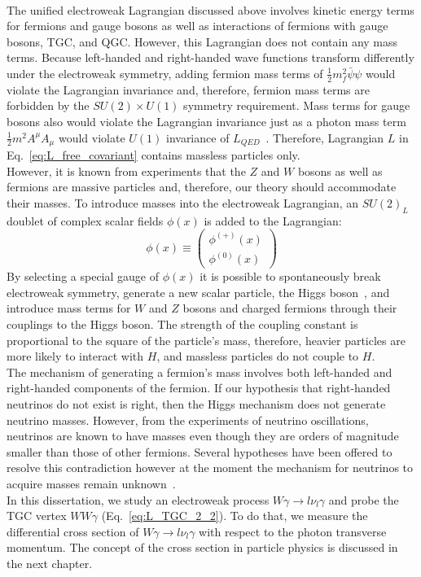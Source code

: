 \\
The unified electroweak Lagrangian discussed above involves kinetic energy terms for fermions and gauge bosons as well as interactions of fermions with gauge bosons, TGC, and QGC. However, this Lagrangian does not contain any mass terms. Because left-handed and right-handed wave functions transform differently under the electroweak symmetry, adding fermion mass terms of $\frac{1}{2} m_f^2 \bar{\psi} \psi$ would violate the Lagrangian invariance and, therefore, fermion mass terms are forbidden by the $SU(2) \times U(1)$ symmetry requirement. Mass terms for gauge bosons also would violate the Lagrangian invariance just as a photon mass term $\frac{1}{2} m^2 A^\mu A_\mu$ would violate $U(1)$ invariance of $L_{QED}$~\cite{ref_Griffiths}. Therefore, Lagrangian $L$ in Eq.~\ref{eq:L_free_covariant} contains massless particles only.\\
However, it is known from experiments that the $Z$ and $W$ bosons as well as fermions are massive particles and, therefore, our theory should accommodate their masses. To introduce masses into the electroweak Lagrangian, an $SU(2)_L$ doublet of complex scalar fields $\phi(x)$ is added to the Lagrangian:\\
\begin{equation}\label{eq:H_doublet}
  \phi(x) \equiv \begin{pmatrix} \phi^{(+)}(x) \\ \phi^{(0)}(x) \end{pmatrix}
\end{equation}
By selecting a special gauge of $\phi(x)$ it is possible to spontaneously break electroweak symmetry, generate a new scalar particle, the Higgs boson~\cite{ref_Pich}, and introduce mass terms for $W$ and $Z$ bosons and charged fermions through their couplings to the Higgs boson. The strength of the coupling constant is proportional to the square of the particle's mass, therefore, heavier particles are more likely to interact with $H$, and massless particles do not couple to $H$.\\
The mechanism of generating a fermion's mass involves both left-handed and right-handed components of the fermion. If our hypothesis that right-handed neutrinos do not exist is right, then the Higgs mechanism does not generate neutrino masses. However, from the experiments of neutrino oscillations, neutrinos are known to have masses even though they are orders of magnitude smaller than those of other fermions. Several hypotheses have been offered to resolve this contradiction however at the moment the mechanism for neutrinos to acquire masses remain unknown~\cite{ref_PDG}.\\
In this dissertation, we study an electroweak process $W\gamma \rightarrow l \nu_l \gamma$ and probe the TGC vertex $WW\gamma$ (Eq.~\ref{eq:L_TGC_2_2}). To do that, we measure the differential cross section of $W\gamma \rightarrow l \nu_l \gamma$ with respect to the photon transverse momentum. The concept of the cross section in particle physics is discussed in the next chapter.\\

